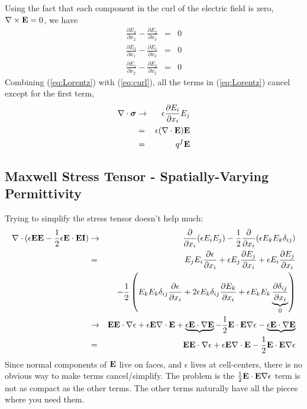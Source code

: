 \documentclass[final]{siamltex}
\def\Eb {{\bf E}}
\def\Ib {{\bf I}}
\def\sigmab {\boldsymbol{\sigma}}
\def\half   {\frac{1}{2}}
\begin{document}
Using the fact that each component in the curl of the electric field is zero,
$\nabla\times\Eb=0$, we have
\begin{eqnarray}
\frac{\partial E_3}{\partial x_2} - \frac{\partial E_2}{\partial x_3} &=& 0 \nonumber\\
\frac{\partial E_3}{\partial x_1} - \frac{\partial E_1}{\partial x_3} &=& 0 \nonumber\\
\frac{\partial E_1}{\partial x_2} - \frac{\partial E_2}{\partial x_2} &=& 0 \label{eq:curl}
\end{eqnarray}
Combining (\ref{eq:Lorentz}) with (\ref{eq:curl}), all the terms in (\ref{eq:Lorentz})
cancel except for the first term,
\begin{eqnarray}
\nabla\cdot\sigmab &\rightarrow& \epsilon\frac{\partial E_i}{\partial x_i}E_j \nonumber\\
&=& \epsilon (\nabla\cdot\Eb) \Eb \nonumber\\
&=& q^f\Eb
\end{eqnarray}

\clearpage

\subsection{Maxwell Stress Tensor - Spatially-Varying Permittivity}
Trying to simplify the stress tensor doesn't help much:
\begin{eqnarray}
\nabla\cdot(\epsilon\Eb\Eb - \half\epsilon\Eb\cdot\Eb\Ib) &\rightarrow& \frac{\partial}{\partial x_i}(\epsilon E_iE_j) - \half\frac{\partial}{\partial x_i}(\epsilon E_kE_k\delta_{ij}) \nonumber\\
&=& E_jE_i\frac{\partial\epsilon}{\partial x_i} + \epsilon E_j\frac{\partial E_j}{\partial x_i} + \epsilon E_i\frac{\partial E_j}{\partial x_i} \nonumber\\
&& - \half\left(E_kE_k\delta_{ij}\frac{\partial\epsilon}{\partial x_i} + 2\epsilon E_k\delta_{ij}\frac{\partial E_k}{\partial x_i} + \epsilon E_kE_k\underbrace{\frac{\partial\delta_{ij}}{\partial x_i}}_{0}\right)\nonumber\\
&\rightarrow& \Eb\Eb\cdot\nabla\epsilon + \epsilon\Eb\nabla\cdot\Eb + \underbrace{\epsilon\Eb\cdot\nabla\Eb} - \half\Eb\cdot\Eb\nabla\epsilon - \underbrace{\epsilon\Eb\cdot\nabla\Eb}\nonumber\\
&=& \Eb\Eb\cdot\nabla\epsilon + \epsilon\Eb\nabla\cdot\Eb - \half\Eb\cdot\Eb\nabla\epsilon
\end{eqnarray}
Since normal components of $\Eb$ live on faces, and $\epsilon$ lives at cell-centers, there is no
obvious way to make terms cancel/simplify.  The problem is the $\half\Eb\cdot\Eb\nabla\epsilon$
term is not as compact as the other terms.  The other terms naturally have all the pieces where you need them.
\end{document}
